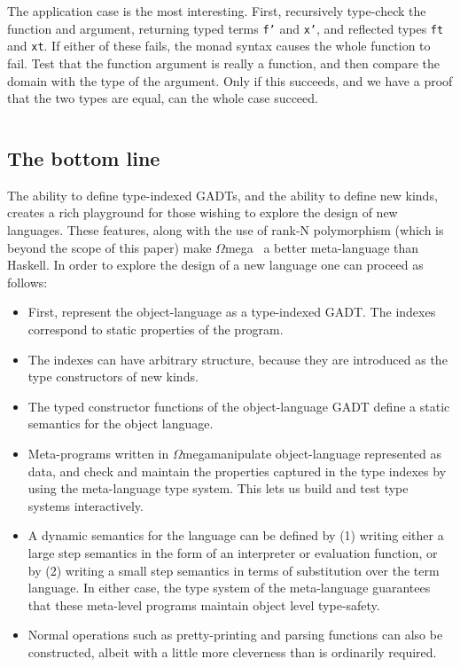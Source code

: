 \documentclass[11pt,twoside,A4]{llncs}
\newcommand{\om}{\emph{$\Omega$}mega}
\begin{document}
The application case is the most interesting. First,
recursively type-check the function and argument, returning
typed terms {\tt f'} and {\tt x'}, and reflected types {\tt ft}
and {\tt xt}. If either of these fails, the monad syntax causes the whole function
to fail. Test that the function argument is really a function, and then
compare the domain with the type of the argument. Only if this succeeds,
and we have a proof that the two types are equal, can the whole case succeed.



 
 {\small
\begin{verbatim}

\end{verbatim}} 

 
\subsection{The bottom line}

The ability to define type-indexed GADTs, and the ability to define new
kinds, creates a rich playground for those wishing to explore the
design of new languages. These features, along with the use of rank-N
polymorphism (which is beyond the scope of this paper) make \om~ a
better meta-language than Haskell. In order to explore the design of a
new language one can proceed as follows:

\begin{itemize}

\item First, represent the object-language as a type-indexed GADT. The indexes
correspond to static properties of the program.

\item The indexes can have arbitrary structure, because they are introduced as
the type constructors of new kinds.

\item The typed constructor functions of the object-language GADT define a
static semantics for the object language.

\item Meta-programs written in \om manipulate object-language
represented as data, and check and maintain the properties captured in
the type indexes by using the meta-language type system. This lets us
build and test type systems interactively.

\item A dynamic semantics for the language can be defined by (1) writing either
a large step semantics in the form of an interpreter or evaluation
function, or by (2) writing a small step semantics in terms of substitution
over the term language. In either case, the type system of the meta-language
guarantees that these meta-level programs maintain object level type-safety.

\item Normal operations such as pretty-printing and parsing functions can also be constructed,
albeit with a little more cleverness than is ordinarily required.

\end{itemize}
\end{document}
